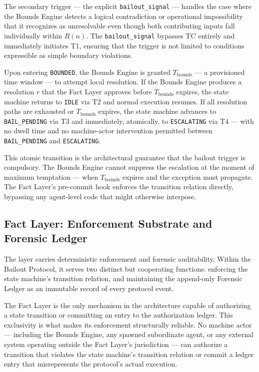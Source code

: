 The secondary trigger --- the explicit \texttt{bailout\_signal} --- handles the case where the Bounds Engine detects a logical contradiction or operational impossibility that it recognizes as unresolvable even though both contributing inputs fall individually within $R(n)$. The \texttt{bailout\_signal} bypasses TC entirely and immediately initiates T1, ensuring that the trigger is not limited to conditions expressible as simple boundary violations.

Upon entering \texttt{BOUNDED}, the Bounds Engine is granted $T_{\text{bounds}}$ --- a provisioned time window --- to attempt local resolution. If the Bounds Engine produces a resolution $r$ that the Fact Layer approves before $T_{\text{bounds}}$ expires, the state machine returns to \texttt{IDLE} via T2 and normal execution resumes. If all resolution paths are exhausted or $T_{\text{bounds}}$ expires, the state machine advances to \texttt{BAIL\_PENDING} via T3 and immediately, atomically, to \texttt{ESCALATING} via T4 --- with no dwell time and no machine-actor intervention permitted between \texttt{BAIL\_PENDING} and \texttt{ESCALATING}.

This atomic transition is the architectural guarantee that the bailout trigger is compulsory. The Bounds Engine cannot suppress the escalation at the moment of maximum temptation --- when $T_{\text{bounds}}$ expires and the exception must propagate. The Fact Layer's pre-commit hook enforces the transition relation directly, bypassing any agent-level code that might otherwise interpose.

\subsection{Fact Layer: Enforcement Substrate and Forensic Ledger}\label{sec:fact-layer}

The \fact{} layer carries deterministic enforcement and forensic auditability. Within the Bailout Protocol, it serves two distinct but cooperating functions: enforcing the state machine's transition relation, and maintaining the append-only Forensic Ledger as an immutable record of every protocol event.

The Fact Layer is the only mechanism in the \bxthree{} architecture capable of authorizing a state transition or committing an entry to the authorization ledger. This exclusivity is what makes its enforcement structurally reliable. No machine actor --- including the Bounds Engine, any spawned subordinate agent, or any external system operating outside the Fact Layer's jurisdiction --- can authorize a transition that violates the state machine's transition relation or commit a ledger entry that misrepresents the protocol's actual execution.

